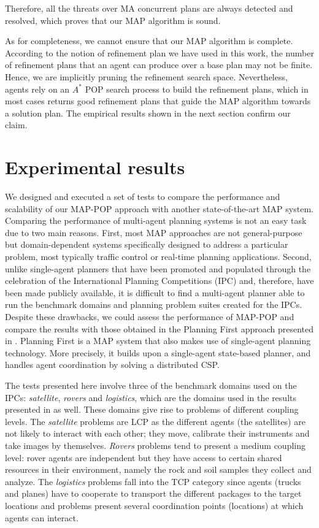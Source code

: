 \documentclass[12pt]{article}
\begin{document}
Therefore, all the threats over MA concurrent plans are always detected and resolved, which proves that our MAP algorithm is sound.

As for completeness, we cannot ensure that our MAP algorithm is complete.
According to the notion of refinement plan we have used in this work, the number of refinement plans that an agent can produce over a base plan may not be finite.
Hence, we are implicitly pruning the refinement search space.
Nevertheless, agents rely on an $A^\ast$ POP search process to build the refinement plans, which in most cases returns good refinement plans that guide the MAP algorithm towards a solution plan.
The empirical results shown in the next section confirm our claim.

\section{Experimental results}

We designed and executed a set of tests to compare the performance and scalability of
our MAP-POP approach with another state-of-the-art MAP system.
Comparing the performance of multi-agent planning systems is not an easy task due to two main reasons.
First, most MAP approaches are not general-purpose but domain-dependent systems specifically designed
to address a particular problem, most typically traffic control or real-time planning applications.
Second, unlike single-agent planners that have been promoted and populated through the celebration of the
International Planning Competitions (IPC) and, therefore, have been made publicly available,
it is difficult to find a multi-agent planner able to run the benchmark domains and planning problem
suites created for the IPCs. Despite these drawbacks, we could assess the performance of MAP-POP
and compare the results with those obtained in the Planning First approach presented in \cite{7d175e0276cb49c2bb75a5844ae4b1b2}.
Planning First is a MAP system that also makes use of single-agent planning technology.
More precisely, it builds upon a single-agent state-based planner,
and handles agent coordination by solving a distributed CSP.

The tests presented here involve three of the benchmark domains used on the IPCs:
\textit{satellite}, \textit{rovers} and \textit{logistics},
which are the domains used in the results presented in \cite{7d175e0276cb49c2bb75a5844ae4b1b2} as well.
These domains give rise to problems of different coupling levels.
The \textit{satellite} problems are LCP as the different agents (the satellites)
are not likely to interact with each other;
they move, calibrate their instruments and take images by themselves.
\textit{Rovers} problems tend to present a medium coupling level:
rover agents are independent but they have access to certain shared resources in their environment,
namely the rock and soil samples they collect and analyze.
The \textit{logistics} problems fall into the TCP category since agents (trucks and planes)
have to cooperate to transport the different packages to the target locations
and problems present several coordination points (locations) at which agents can interact.
\end{document}
